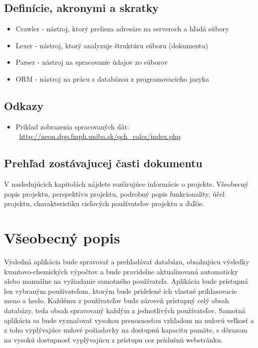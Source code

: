 \documentclass[12pt,a4paper]{article}
\begin{document}
\subsection{Definície, akronymi a skratky}
\begin{itemize}
	\item Crawler - nástroj, ktorý prelieza adresáre na serveroch a hľadá súbory
	\item Lexer - nástroj, ktorý analyzuje štruktúru súboru (dokumentu)
	\item Parser - nástroj na spracovanie údajov zo súborov
	\item ORM - nástroj na prácu s databázou z programovacieho jazyka
\end{itemize}

\subsection{Odkazy}
\begin{itemize}
	\item Priklad zobrazenia spracovaných dát: \ \url{http://neon.dpp.fmph.uniba.sk/qch_calcs/index.php}
\end{itemize}

\subsection{Prehľad zostávajucej časti dokumentu}
V nasledujúcich kapitolách nájdete rozširujúce informácie o projekte.
Všeobecný popis projektu, perspektívu projektu, podrobný popis funkcionality, účel projektu, charakteristiku cieľových používateľov projektu a ďaľšie.


\section{Všeobecný popis}
Výsledná aplikácia bude spravovať a prehľadávať databázu, obsahujúcu výsledky kvantovo-chemických výpočtov a bude pravidelne aktualizovaná automaticky alebo manuálne na vyžiadanie samotného používateľa. Aplikácia bude prístupná len vybraným používateľom, ktorým bude pridelené ich vlastné prihlasovacie meno a heslo. Každému z používateľov bude zároveň prístupný celý obsah databázy, teda obsah spravovaný každým z jednotlivých používateľov. Samotná aplikácia sa bude vyznačovať vysokou prenosnosťou vzhľadom na nulovú veľkosť a z toho vyplývajúce nulové požiadavky na dostupnú kapacitu pamäte, s dôrazom na vysokú dostupnosť vyplývajúcu z prístupu cez príslušnú webstránku.
\end{document}

